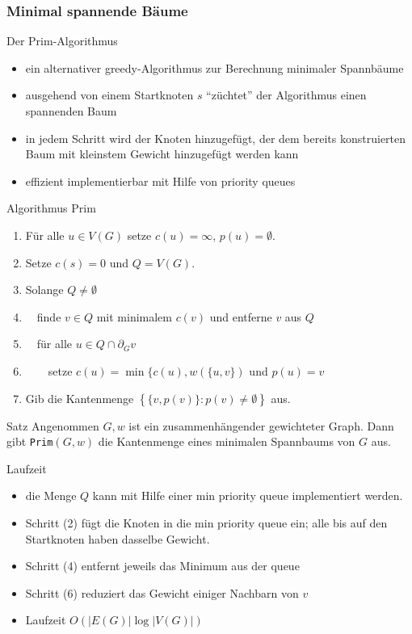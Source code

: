 \documentclass[aspectratio=1610, 11pt]{beamer}
\newcommand\cbc[1]{\left\{{#1}\right\}}
\newcommand{\mytitle}{Minimal spannende B\"aume}
\begin{document}
\begin{frame}\frametitle{\mytitle}
	\begin{overprint}
		\begin{exampleblock}{Der Prim-Algorithmus}
			\begin{itemize}
				\item ein alternativer greedy-Algorithmus zur Berechnung minimaler Spannb\"aume
				\item ausgehend von einem Startknoten $s$ ``z\"uchtet'' der Algorithmus einen spannenden Baum
				\item in jedem Schritt wird der Knoten hinzugef\"ugt, der dem bereits konstruierten Baum mit kleinstem Gewicht hinzugef\"ugt werden kann
				\item effizient implementierbar mit Hilfe von priority queues
			\end{itemize}
		\end{exampleblock}
		\begin{exampleblock}{Algorithmus Prim}
	\begin{enumerate}
		\item F\"ur alle $u\in V(G)$ setze $c(u)=\infty$, $p(u)=\emptyset$.
		\item Setze $c(s)=0$ und $Q=V(G)$.
		\item Solange $Q\neq\emptyset$
		\item $\quad$finde $v\in Q$ mit minimalem $c(v)$ und entferne $v$ aus $Q$
		\item $\quad$f\"ur alle $u\in Q\cap\partial_Gv$
		\item $\quad\quad$setze $c(u)=\min\{c(u),w(\{u,v\})$ und $p(u)=v$
		\item Gib die Kantenmenge $\cbc{\{v,p(v)\}:p(v)\neq\emptyset}$ aus.
	\end{enumerate}
		\end{exampleblock}
\begin{block}{Satz}
	Angenommen $G,w$ ist ein zusammenh\"angender gewichteter Graph.
	Dann gibt {\tt Prim}$(G,w)$ die Kantenmenge eines minimalen Spannbaums von $G$ aus.
\end{block}
\begin{exampleblock}{Laufzeit}
	\begin{itemize}
		\item die Menge $Q$ kann mit Hilfe einer min priority queue implementiert werden.
		\item Schritt (2) f\"ugt die Knoten in die min priority queue ein; alle bis auf den Startknoten haben dasselbe Gewicht.
			\item Schritt (4) entfernt jeweils das Minimum aus der queue
			\item Schritt (6) reduziert das Gewicht einiger Nachbarn von $v$
				\item Laufzeit $O(|E(G)|\log|V(G)|)$
	\end{itemize}
\end{exampleblock}
	\end{overprint}
\end{frame}
\end{document}
